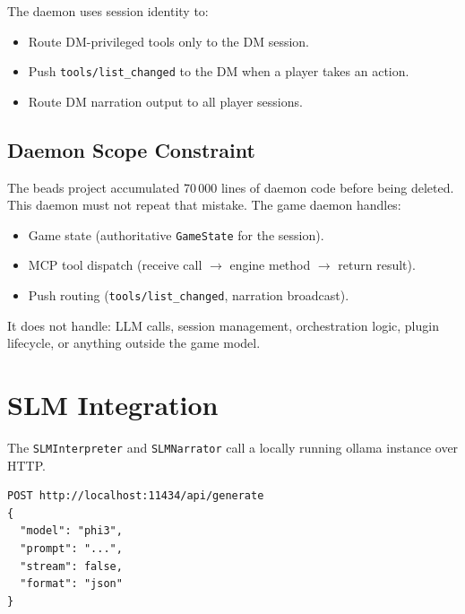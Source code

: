 \documentclass[a4paper,10pt]{article}
\begin{document}
The daemon uses session identity to:

\begin{itemize}
  \item Route DM-privileged tools only to the DM session.
  \item Push \texttt{tools/list\_changed} to the DM when a player
    takes an action.
  \item Route DM narration output to all player sessions.
\end{itemize}

\subsection{Daemon Scope Constraint}

The beads project accumulated 70\,000 lines of daemon code before
being deleted.  This daemon must not repeat that mistake.  The
game daemon handles:

\begin{itemize}
  \item Game state (authoritative \texttt{GameState} for the session).
  \item MCP tool dispatch (receive call $\to$ engine method $\to$
    return result).
  \item Push routing (\texttt{tools/list\_changed}, narration
    broadcast).
\end{itemize}

It does not handle: LLM calls, session management, orchestration
logic, plugin lifecycle, or anything outside the game model.

\section{SLM Integration}

The \texttt{SLMInterpreter} and \texttt{SLMNarrator} call a locally
running ollama instance over HTTP.

\begin{lstlisting}[title={ollama request (CommandInterpreter)}]
POST http://localhost:11434/api/generate
{
  "model": "phi3",
  "prompt": "...",
  "stream": false,
  "format": "json"
}
\end{lstlisting}
\end{document}
